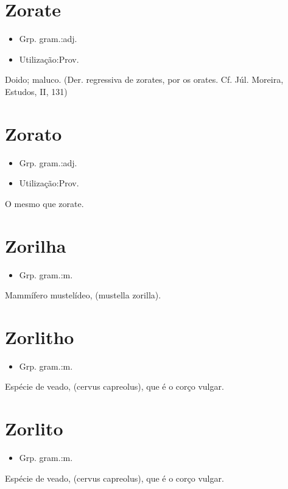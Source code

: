 \section{Zorate}
\begin{itemize}
\item {Grp. gram.:adj.}
\end{itemize}
\begin{itemize}
\item {Utilização:Prov.}
\end{itemize}
Doido; maluco.
(Der. regressiva de \textunderscore zorates\textunderscore , por \textunderscore os orates\textunderscore . Cf. Júl. Moreira, \textunderscore Estudos\textunderscore , II, 131)
\section{Zorato}
\begin{itemize}
\item {Grp. gram.:adj.}
\end{itemize}
\begin{itemize}
\item {Utilização:Prov.}
\end{itemize}
O mesmo que \textunderscore zorate\textunderscore .
\section{Zorilha}
\begin{itemize}
\item {Grp. gram.:m.}
\end{itemize}
Mammífero mustelídeo, (\textunderscore mustella zorilla\textunderscore ).
\section{Zorlitho}
\begin{itemize}
\item {Grp. gram.:m.}
\end{itemize}
Espécie de veado, (\textunderscore cervus capreolus\textunderscore ), que é o corço vulgar.
\section{Zorlito}
\begin{itemize}
\item {Grp. gram.:m.}
\end{itemize}
Espécie de veado, (\textunderscore cervus capreolus\textunderscore ), que é o corço vulgar.
